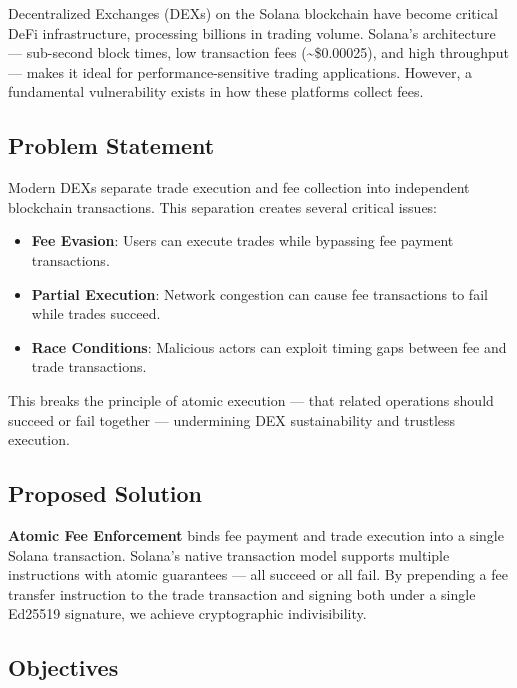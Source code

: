 \documentclass[12pt,a4paper]{article}
\begin{document}
Decentralized Exchanges (DEXs) on the Solana blockchain have become critical DeFi infrastructure, processing billions in trading volume. Solana's architecture --- sub-second block times, low transaction fees (\textasciitilde\$0.00025), and high throughput --- makes it ideal for performance-sensitive trading applications. However, a fundamental vulnerability exists in how these platforms collect fees.

\subsection{Problem Statement}

Modern DEXs separate trade execution and fee collection into independent blockchain transactions. This separation creates several critical issues:

\begin{itemize}
    \item \textbf{Fee Evasion}: Users can execute trades while bypassing fee payment transactions.
    \item \textbf{Partial Execution}: Network congestion can cause fee transactions to fail while trades succeed.
    \item \textbf{Race Conditions}: Malicious actors can exploit timing gaps between fee and trade transactions.
\end{itemize}

This breaks the principle of atomic execution --- that related operations should succeed or fail together --- undermining DEX sustainability and trustless execution.

\subsection{Proposed Solution}

\textbf{Atomic Fee Enforcement} binds fee payment and trade execution into a single Solana transaction. Solana's native transaction model supports multiple instructions with atomic guarantees --- all succeed or all fail. By prepending a fee transfer instruction to the trade transaction and signing both under a single Ed25519 signature, we achieve cryptographic indivisibility.

\subsection{Objectives}
\end{document}
